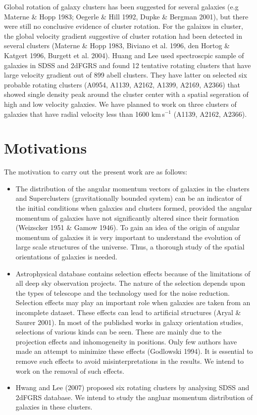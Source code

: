 Global rotation of galaxy clusters has been suggested for several galaxies (e.g Materne \& Hopp 1983; Oegerle \& Hill 1992, Dupke \& Bergman 2001), but there were still no conclusive evidence of cluster rotation. For the galaixes in cluster, the global velocity gradient suggestive of cluster rotation had been detected in several clusters (Materne \& Hopp 1983, Biviano et al. 1996, den Hortog \& Katgert 1996, Burgett et al. 2004). Huang and Lee used spectroscpic sample of galaxies in SDSS and 2dFGRS and found 12 tentative rotating clusters that have large velocity gradient out of 899 abell clusters. They have latter on selected six probable rotating clusters (A0954, A1139, A2162, A1399, A2169, A2366) that showed single density peak around the cluster center with a spatial segeration of high and low velocity galaxies. We have planned to work on three clusters of galaxies that have radial velocity less than 1600 km\,s$^{-1}$ (A1139, A2162, A2366).
\section{Motivations}
The motivation to carry out the present work are as follows:
\begin{itemize}
\item The distribution of the angular momentum vectors of galaxies in the clusters and Superclusters (gravitationally bounded system) can be an indicator of the initial conditions
when galaxies and clusters formed, provided the angular momentum of galaxies have
not significantly altered since their formation (Weizscker 1951 \& Gamow 1946). To
gain an idea of the origin of angular momentum of galaxies it is very important to
understand the evolution of large scale structures of the universe. Thus, a thorough
study of the spatial orientations of galaxies is needed.
\item Astrophysical database contains selection effects because of the limitations of all deep sky observation projects. The nature of the selection depends upon the types of telescope and the technology used for the noise reduction. Selection effects may play an important role when galaxies are taken from an incomplete
dataset. These effects can lead to artificial structures (Aryal \& Saurer 2001). In most
of the published works in galaxy orientation studies, selections of various kinds can be
seen. These are mainly due to the projection effects and inhomogeneity in positions.
Only few authors have made an attempt to minimize these effects (Godlowski
1994). It is essential to remove such effects to avoid misinterpretations in the results.
We intend to work on the removal of such effects.
\item Hwang and Lee (2007) proposed six rotating clusters by analysing SDSS and 2dFGRS database. We intend to study the angluar momentum distribution of galaxies in these clusters.
\end{itemize}
